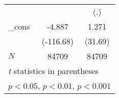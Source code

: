 {\begin{tabular}{l*{2}{c}}
            &                     &         (.)         \\
[1em]
\_cons      &      -4.887\sym{***}&       1.271\sym{***}\\
            &   (-116.68)         &     (31.69)         \\
\hline
\(N\)       &       84709         &       84709         \\
\hline\hline
\multicolumn{3}{l}{\footnotesize \textit{t} statistics in parentheses}\\
\multicolumn{3}{l}{\footnotesize \sym{*} \(p<0.05\), \sym{**} \(p<0.01\), \sym{***} \(p<0.001\)}\\
\end{tabular}
}
